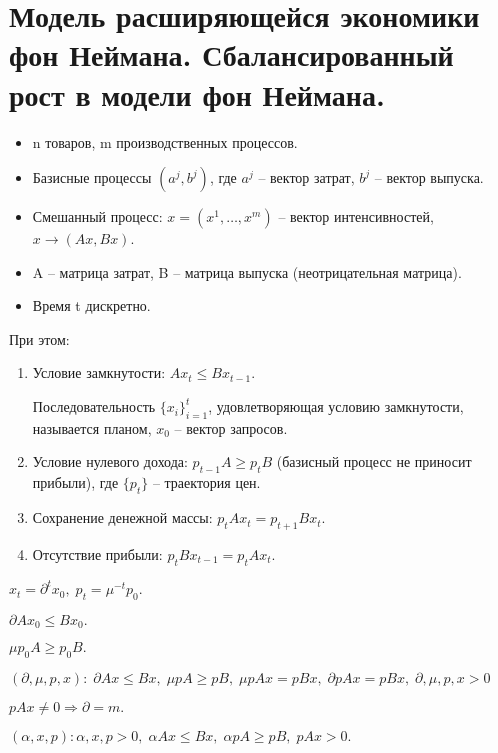 \chapter{Модель расширяющейся экономики фон Неймана. Сбалансированный рост в модели фон Неймана.}\label{cha:12}

\begin{itemize}
	\item n товаров, m производственных процессов.
	\item Базисные процессы $(a^j, b^j)$, где $a^j$ -- вектор затрат, $b^j$ -- вектор выпуска.
	\item Смешанный процесс: $x = (x^1, \ldots, x^m)$ -- вектор интенсивностей, $x \rightarrow (Ax, Bx)$.
	\item A -- матрица затрат, B -- матрица выпуска (неотрицательная матрица).
	\item Время t дискретно.
\end{itemize}

При этом:

\begin{enumerate}
	\item Условие замкнутости: $Ax_t \leq Bx_{t-1}.$
	\begin{definition}
		Последовательность $\{ x_i\}_{i = 1}^t$, удовлетворяющая условию замкнутости, называется планом, $x_0$ -- вектор запросов.
	\end{definition}
	\item Условие нулевого дохода: $p_{t-1}A \geq p_tB$ (базисный процесс не приносит прибыли), где $\{ p_t\}$ -- траектория цен.
	\item Сохранение денежной массы: $p_t A x_t = p_{t + 1} B x_t.$
	\item Отсутствие прибыли: $p_t B x_{t-1} = p_t A x_t.$
\end{enumerate}

\begin{definition}
	$x_t = \partial^t x_0, \; p_t = \mu^{-t}p_0.$
\end{definition}

\begin{definition}
	$\partial A x_0 \leq B x_0.$
\end{definition}

\begin{definition}
	$\mu p_0 A \geq p_0 B.$
\end{definition}

\begin{definition}
	$(\partial, \mu, p, x): \; \partial A x \leq Bx, \; \mu p A \geq p B, \; \mu p A x = pBx, \; \partial pAx = pBx, \; \partial, \mu, p, x > 0$
\end{definition}

\begin{remark}
	$pAx \neq 0 \Rightarrow \partial = m.$
\end{remark}

\begin{definition}
	$(\alpha, x, p): \alpha, x, p > 0, \; \alpha A x \leq Bx, \; \alpha p A \geq pB, \; pAx > 0.$
\end{definition}
